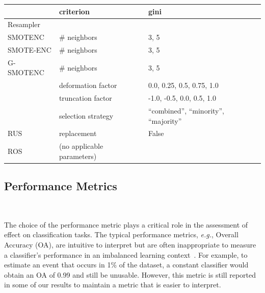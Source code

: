\documentclass[parskip=full]{scrartcl}
\begin{document}
\begin{table}[ht]
\begin{tabular}{lll}
                        & criterion                        & gini                           \\
		\toprule
		Resampler       &                                  &                                \\
		\midrule
		SMOTENC         & \# neighbors                     & 3, 5                           \\
		SMOTE-ENC       & \# neighbors                     & 3, 5                           \\
		G-SMOTENC       & \# neighbors                     & 3, 5                           \\
                        & deformation factor               & 0.0, 0.25, 0.5, 0.75, 1.0      \\
                        & truncation factor                & -1.0, -0.5, 0.0, 0.5, 1.0      \\
                        & selection strategy               & ``combined'',
                        ``minority'', ``majority''\\
		RUS             & replacement                      & False                          \\
		ROS             & (no applicable parameters)       &                                \\
		\bottomrule
	\end{tabular}
\end{table}

\subsection{Performance Metrics}~\label{sec:performance_metrics}

The choice of the performance metric plays a critical role in the assessment
of effect on classification tasks. The typical performance metrics,
\textit{e.g.}, Overall Accuracy (OA), are intuitive to interpret but are often
inappropriate to measure a classifier's performance in an imbalanced learning
context~\cite{sun2009classification}. For example, to estimate an event that
occurs in 1\% of the dataset, a constant classifier would obtain an OA of 0.99
and still be unusable. However, this metric is still reported in some of our
results to maintain a metric that is easier to interpret.
\end{document}

